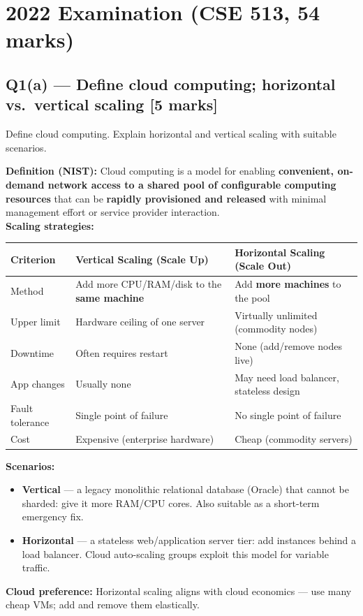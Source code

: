 \documentclass[12pt, a4paper]{article}
\newenvironment{qbox}{\begin{mdframed}[style=qframe]}{\end{mdframed}}
\newenvironment{solbox}{\begin{mdframed}[style=solframe]}{\end{mdframed}}
\newcommand{\qmarks}[1]{\hfill\textbf{\color{orange!70!black}[#1 marks]}}
\begin{document}
\section{2022 Examination (CSE 513, 54 marks)}

\subsection{Q1(a) --- Define cloud computing; horizontal vs.\ vertical scaling
  \texorpdfstring{\qmarks{5}}{}}
\begin{qbox}Define cloud computing. Explain horizontal and vertical scaling with suitable
scenarios.\end{qbox}
\begin{solbox}
\textbf{Definition (NIST):} Cloud computing is a model for enabling \textbf{convenient,
on-demand network access to a shared pool of configurable computing resources} that can be
\textbf{rapidly provisioned and released} with minimal management effort or service provider
interaction.\\[6pt]

\textbf{Scaling strategies:}
\begin{center}\renewcommand{\arraystretch}{1.3}
\begin{tabularx}{\linewidth}{l X X}
\toprule
\textbf{Criterion} & \textbf{Vertical Scaling (Scale Up)} & \textbf{Horizontal Scaling (Scale Out)} \\
\midrule
Method           & Add more CPU/RAM/disk to the \textbf{same machine} & Add \textbf{more machines} to the pool \\
Upper limit      & Hardware ceiling of one server & Virtually unlimited (commodity nodes) \\
Downtime         & Often requires restart & None (add/remove nodes live) \\
App changes      & Usually none & May need load balancer, stateless design \\
Fault tolerance  & Single point of failure & No single point of failure \\
Cost             & Expensive (enterprise hardware) & Cheap (commodity servers) \\
\bottomrule
\end{tabularx}\end{center}

\textbf{Scenarios:}
\begin{itemize}[leftmargin=1.4cm, itemsep=3pt]
  \item \textbf{Vertical} --- a legacy monolithic relational database (Oracle) that cannot be
    sharded: give it more RAM/CPU cores. Also suitable as a short-term emergency fix.
  \item \textbf{Horizontal} --- a stateless web/application server tier: add instances behind a
    load balancer. Cloud auto-scaling groups exploit this model for variable traffic.
\end{itemize}
\textbf{Cloud preference:} Horizontal scaling aligns with cloud economics --- use many cheap
VMs; add and remove them elastically.
\end{solbox}
\end{document}

